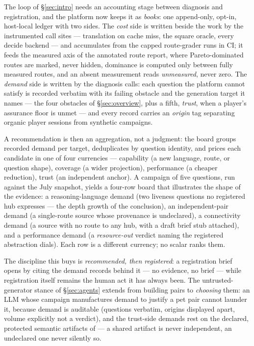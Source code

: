 The loop of \S\ref{sec:intro} needs an accounting stage between
diagnosis and registration, and the platform now keeps it as
\emph{books}: one append-only, opt-in, host-local ledger with two sides.
The \emph{cost} side is written beside the work by the instrumented call
sites --- translation on cache miss, the square oracle, every decide
backend --- and accumulates from the capped route-grader runs in CI; it
feeds the measured axis of the annotated route report, where
Pareto-dominated routes are marked, never hidden, dominance is computed
only between fully measured routes, and an absent measurement reads
\emph{unmeasured}, never zero. The \emph{demand} side is written by the
diagnosis calls: each question the platform cannot satisfy is recorded
verbatim with its failing obstacle and the generation target it names
--- the four obstacles of \S\ref{sec:overview}, plus a fifth,
\emph{trust}, when a player's assurance floor is unmet --- and every
record carries an \emph{origin} tag separating organic player sessions
from synthetic campaigns.

A recommendation is then an aggregation, not a judgment: the board
groups recorded demand per target, deduplicates by question identity,
and prices each candidate in one of four currencies --- capability (a
new language, route, or question shape), coverage (a wider projection),
performance (a cheaper reduction), trust (an independent anchor). A
campaign of five questions, run against the July snapshot, yields a
four-row board that illustrates the shape of the evidence: a
reasoning-language demand (two liveness questions no registered hub
expresses --- the depth growth of the conclusion), an independent-pair
demand (a single-route source whose provenance is undeclared), a
connectivity demand (a source with no route to any hub, with a draft
brief stub attached), and a performance demand (a \emph{resource-out}
verdict naming the registered abstraction dials). Each row is a
different currency; no scalar ranks them.

The discipline this buys is \emph{recommended, then registered}: a
registration brief opens by citing the demand records behind it --- no
evidence, no brief --- while registration itself remains the human act
it has always been. The untrusted-generator stance of
\S\ref{sec:agents} extends from building pairs to \emph{choosing} them:
an LLM whose campaign manufactures demand to justify a pet pair cannot
launder it, because demand is auditable (questions verbatim, origins
displayed apart, volume explicitly not a verdict), and the trust-side
demands rest on the declared, protected semantic artifacts of
 --- a shared artifact is never independent, an
undeclared one never silently so.
\fi

